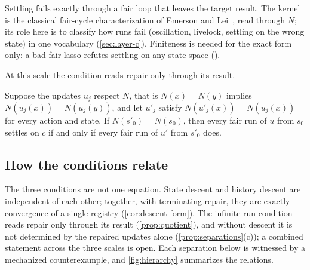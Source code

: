 Settling fails exactly through a fair loop that leaves the target result. The kernel is the classical
fair-cycle characterization of Emerson and Lei~\cite{emersonlei1987}, read through $N$; its role here
is to classify how runs fail (oscillation, livelock, settling on the wrong state) in one vocabulary
(\cref{sec:layer-c}). Finiteness is needed for the exact form only: a bad fair lasso refutes settling
on any state space ().

At this scale the condition reads repair only through its result.

\begin{proposition}\label{prop:quotient}
Suppose the updates $u_j$ respect $N$, that is $N(x) = N(y)$ implies $N(u_j(x)) = N(u_j(y))$, and
let $u'_j$ satisfy $N(u'_j(x)) = N(u_j(x))$ for every action and state. If $N(s'_0) = N(s_0)$, then
every fair run of $u$ from $s_0$ settles on $c$ if and only if every fair run of $u'$ from $s'_0$
does.
\end{proposition}

\subsection{How the conditions relate}\label{sec:main-hierarchy}

The three conditions are not one equation. State descent and history descent are independent of each
other; together, with terminating repair, they are exactly convergence of a single registry
(\cref{cor:descent-form}). The infinite-run condition reads repair only through its result
(\cref{prop:quotient}), and without descent it is not determined by the repaired updates alone
(\cref{prop:separations}(c)); a combined statement across the three scales is open. Each separation
below is witnessed by a mechanized counterexample, and \cref{fig:hierarchy} summarizes the relations.

